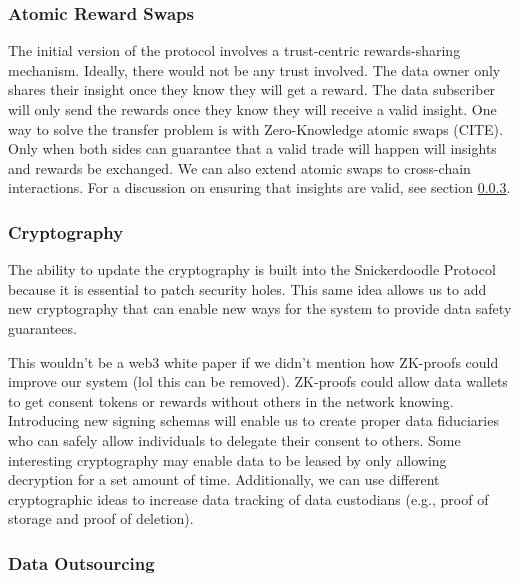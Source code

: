 \subsubsection{Atomic Reward Swaps}
\label{section:AtomicSwaps}
The initial version of the protocol involves a trust-centric rewards-sharing mechanism. Ideally, there would not be any trust involved. The data owner only shares their insight once they know they will get a reward. The data subscriber will only send the rewards once they know they will receive a valid insight. One way to solve the transfer problem is with Zero-Knowledge atomic swaps (CITE). Only when both sides can guarantee that a valid trade will happen will insights and rewards be exchanged. We can also extend atomic swaps to cross-chain interactions. For a discussion on ensuring that insights are valid, see section \ref{section:DataOutsourcing}.


\subsubsection{Cryptography}
The ability to update the cryptography is built into the Snickerdoodle Protocol because it is essential to patch security holes. This same idea allows us to add new cryptography that can enable new ways for the system to provide data safety guarantees. 

This wouldn't be a web3 white paper if we didn't mention how ZK-proofs could improve our system (lol this can be removed). ZK-proofs could allow data wallets to get consent tokens or rewards without others in the network knowing. Introducing new signing schemas will enable us to create proper data fiduciaries who can safely allow individuals to delegate their consent to others. Some interesting cryptography may enable data to be leased by only allowing decryption for a set amount of time. Additionally, we can use different cryptographic ideas to increase data tracking of data custodians (e.g., proof of storage and proof of deletion).

\subsubsection{Data Outsourcing}
\label{section:DataOutsourcing}

